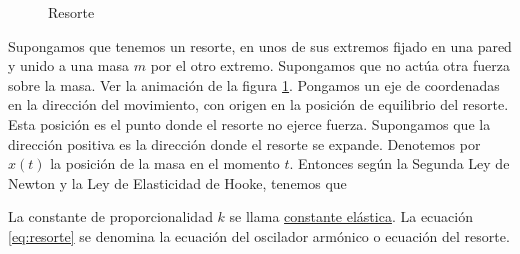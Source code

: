 \documentclass{article}
\begin{document}
\begin{figure}[h]
 \begin{center}
 \caption{Resorte}\label{fig:resortito}
 \end{center}
 \end{figure}

 Supongamos que tenemos un resorte, en unos de sus extremos fijado en una pared y unido a una masa $m$ por el otro extremo. Supongamos que no actúa otra fuerza 
 sobre la masa. Ver la animación de la figura \ref{fig:resortito}.  Pongamos un eje de coordenadas en la dirección del movimiento, con origen en la posición de equilibrio
 del resorte. Esta posición es el punto donde el resorte no ejerce fuerza. Supongamos que la dirección positiva es la dirección donde el resorte se expande. Denotemos 
 por $x(t)$ la posición de la masa en el momento $t$.    Entonces según la Segunda Ley de Newton y la Ley de Elasticidad de Hooke, tenemos que
 
 
La constante de proporcionalidad $k$ se llama \href{http://es.wikipedia.org/wiki/Rigidez}{constante elástica}. La ecuación \eqref{eq:resorte} se denomina la
ecuación del oscilador armónico o ecuación del resorte.
\end{document}
